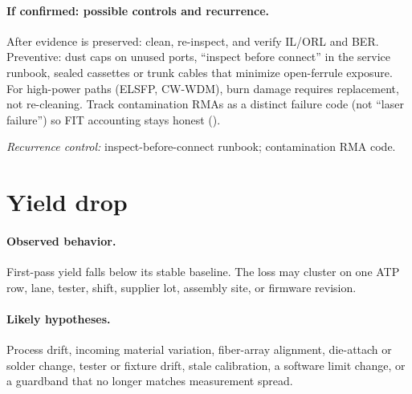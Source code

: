 \paragraph{If confirmed: possible controls and recurrence.}
After evidence is preserved: clean, re-inspect, and verify IL/ORL and BER.
Preventive: dust caps on unused ports, ``inspect before connect'' in the service
runbook, sealed cassettes or trunk cables that minimize open-ferrule exposure. For
high-power paths (ELSFP, CW-WDM), burn damage requires replacement, not
re-cleaning. Track contamination RMAs as a distinct failure code (not ``laser
failure'') so FIT accounting stays honest ().


\emph{Recurrence control:} inspect-before-connect runbook; contamination RMA code.

\section{Yield drop}
\label{sec:fm-yield-drop}

\paragraph{Observed behavior.}
First-pass yield falls below its stable baseline. The loss may cluster on one ATP
row, lane, tester, shift, supplier lot, assembly site, or firmware revision.


\paragraph{Likely hypotheses.}
Process drift, incoming material variation, fiber-array alignment, die-attach or
solder change, tester or fixture drift, stale calibration, a software limit change,
or a guardband that no longer matches measurement spread.

